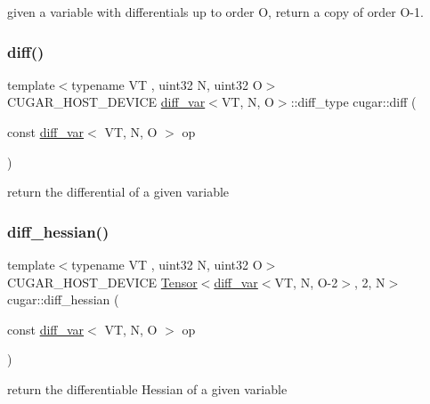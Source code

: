 given a variable with differentials up to order O, return a copy of order O-\/1. \mbox{\label{group___auto_diff_module_ga4d07150db2aa5b201c75e376b5580eba}} 
\subsubsection{\texorpdfstring{diff()}{diff()}}
{\footnotesize\ttfamily template$<$typename VT , uint32 N, uint32 O$>$ \\
C\+U\+G\+A\+R\+\_\+\+H\+O\+S\+T\+\_\+\+D\+E\+V\+I\+CE \hyperlink{structcugar_1_1diff__var}{diff\+\_\+var}$<$VT, N, O$>$\+::diff\+\_\+type cugar\+::diff (\begin{DoxyParamCaption}\item[{const \hyperlink{structcugar_1_1diff__var}{diff\+\_\+var}$<$ VT, N, O $>$}]{op }\end{DoxyParamCaption})\hspace{0.3cm}{\ttfamily [inline]}}

return the differential of a given variable \mbox{\label{group___auto_diff_module_ga518dc6dc852ca96522bcbb651298a625}} 
\subsubsection{\texorpdfstring{diff\+\_\+hessian()}{diff\_hessian()}}
{\footnotesize\ttfamily template$<$typename VT , uint32 N, uint32 O$>$ \\
C\+U\+G\+A\+R\+\_\+\+H\+O\+S\+T\+\_\+\+D\+E\+V\+I\+CE \hyperlink{structcugar_1_1_tensor}{Tensor}$<$\hyperlink{structcugar_1_1diff__var}{diff\+\_\+var}$<$VT, N, O-\/2$>$, 2, N$>$ cugar\+::diff\+\_\+hessian (\begin{DoxyParamCaption}\item[{const \hyperlink{structcugar_1_1diff__var}{diff\+\_\+var}$<$ VT, N, O $>$}]{op }\end{DoxyParamCaption})\hspace{0.3cm}{\ttfamily [inline]}}

return the differentiable Hessian of a given variable \mbox{\label{group___auto_diff_module_gad3b328633420b6077be413a7cdfef6a8}} 
